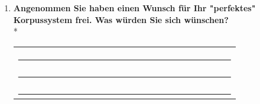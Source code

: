 \begin{enumerate}
	\item{
		\textbf{Angenommen Sie haben einen Wunsch für Ihr "perfektes" Korpussystem frei. Was würden Sie sich wünschen?}\\*
		
			\begin{tabular}{l}
				\underline{\ \ \ \ \ \ \ \ \ \ \ \ \ \ \ \ \ \ \ \ \ \ \ \ \ \ \ \ \ \ \ \ \ \ \ \ \ \ \ \ \ \ \ \ \ } \\
				\underline{\ \ \ \ \ \ \ \ \ \ \ \ \ \ \ \ \ \ \ \ \ \ \ \ \ \ \ \ \ \ \ \ \ \ \ \ \ \ \ \ \ \ \ \ \ } \\
				\underline{\ \ \ \ \ \ \ \ \ \ \ \ \ \ \ \ \ \ \ \ \ \ \ \ \ \ \ \ \ \ \ \ \ \ \ \ \ \ \ \ \ \ \ \ \ }
			\end{tabular}
	}


\end{enumerate}
